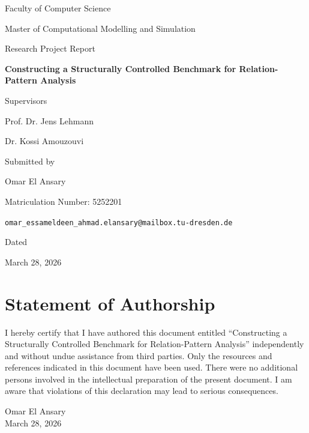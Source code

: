 \documentclass[12pt,a4paper]{article}
\title{\reporttitle}
\author{\studentname}
\date{\submissiondate}
\makeatletter
\newcommand{\facultyname}{Faculty of Computer Science}
\newcommand{\programname}{Master of Computational Modelling and Simulation}
\newcommand{\reporttype}{Research Project Report}
\newcommand{\reporttitle}{Constructing a Structurally Controlled Benchmark for Relation-Pattern Analysis}
\newcommand{\studentname}{Omar El Ansary}
\newcommand{\matriculationnumber}{5252201}
\newcommand{\studentemail}{omar\_essameldeen\_ahmad.elansary@mailbox.tu-dresden.de}
\newcommand{\supervisorone}{Prof. Dr. Jens Lehmann}
\newcommand{\supervisortwo}{Dr. Kossi Amouzouvi}
\newcommand{\submissiondate}{March 28, 2026}
\makeatother
\begin{document}
\begin{titlepage}
\centering
\vspace*{1.5cm}
{\Large \facultyname \par}
\vspace{1.4cm}
{\large \programname \par}
\vspace{0.4cm}
{\large \reporttype \par}
\vspace{2.2cm}
{\LARGE\bfseries \reporttitle \par}
\vfill
{\large Supervisors \par}
\vspace{0.3cm}
{\large \supervisorone \par}
{\large \supervisortwo \par}
\vspace{1.4cm}
{\large Submitted by \par}
\vspace{0.3cm}
{\large \studentname \par}
{\large Matriculation Number: \matriculationnumber \par}
{\large \texttt{\studentemail} \par}
\vspace{1.4cm}
{\large Dated \par}
\vspace{0.3cm}
{\large \submissiondate \par}
\end{titlepage}

\clearpage
\thispagestyle{empty}
\section*{Statement of Authorship}
I hereby certify that I have authored this document entitled ``\reporttitle'' independently and without undue assistance from third parties. Only the resources and references indicated in this document have been used. There were no additional persons involved in the intellectual preparation of the present document. I am aware that violations of this declaration may lead to serious consequences.

\vfill
\noindent \studentname \\
\submissiondate
\end{document}
